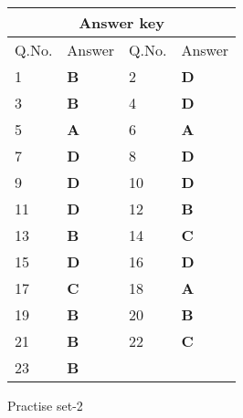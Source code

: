 \begin{table}[H]
	\centering
	\begin{tabular}{|p{1.5cm}|p{1.5cm}||p{1.5cm}|p{1.5cm}|}
		\hline
		\multicolumn{4}{|c|}{\textbf{Answer key}}\\\hline\hline
		\rowcolor{ocrel}Q.No.&Answer&Q.No.&Answer\\\hline
		1&\textbf{B} &2&\textbf{D}\\\hline 
		3&\textbf{B} &4&\textbf{D} \\\hline
		5&\textbf{A} &6&\textbf{A} \\\hline
		7&\textbf{D}&8&\textbf{D}\\\hline
		9&\textbf{D}&10&\textbf{D}\\\hline
		11&\textbf{D} &12&\textbf{B}\\\hline
		13&\textbf{B}&14&\textbf{C}\\\hline
		15&\textbf{D}&16&\textbf{D} \\\hline
		17&\textbf{C}&18&\textbf{A}\\\hline
		19&\textbf{B}&20&\textbf{B}\\\hline
		21&\textbf{B} &22&\textbf{C}\\\hline
		23&\textbf{B}&&\textbf{}\\\hline
	\end{tabular}
\end{table}
\newpage
\begin{abox}
	Practise set-2
\end{abox}
